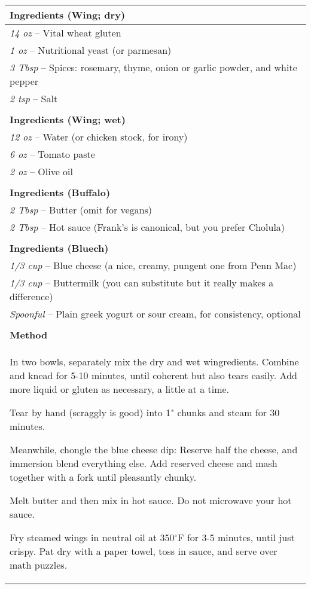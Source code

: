 \documentclass[12pt]{article}
\begin{document}
\vspace{1em}

\noindent \begin{tabular}{p{}}
	{\bf Ingredients (Wing; dry)} \\
	\hline
	{\em 14 oz} -- Vital wheat gluten \\
	{\em 1 oz} -- Nutritional yeast (or parmesan) \\
	{\em 3 Tbsp} -- Spices: rosemary, thyme, onion or garlic powder, and white pepper \\
	{\em 2 tsp} -- Salt \\
	\\
	{\bf Ingredients (Wing; wet)} \\
	\hline
	{\em 12 oz} -- Water (or chicken stock, for irony) \\
	{\em 6 oz} -- Tomato paste \\
	{\em 2 oz} -- Olive oil \\
	\\
	{\bf Ingredients (Buffalo)} \\
	\hline
	{\em 2 Tbsp} -- Butter (omit for vegans) \\
	{\em 2 Tbsp} -- Hot sauce (Frank's is canonical, but you prefer Cholula) \\
	\\
	{\bf Ingredients (Bluech)} \\
	\hline
	{\em 1/3 cup} -- Blue cheese (a nice, creamy, pungent one from Penn Mac) \\
	{\em 1/3 cup} -- Buttermilk (you can substitute but it really makes a difference) \\
	{\em Spoonful} -- Plain greek yogurt or sour cream, for consistency, optional \\
	\\
	{\bf Method} \\
	\hline
\setlength{\parskip}{0.5em}
	In two bowls, separately mix the dry and wet wingredients. Combine and knead for 5-10 minutes, until coherent but also tears easily. Add more liquid or gluten as necessary, a little at a time.

	Tear by hand (scraggly is good) into 1" chunks and steam for 30 minutes.

	Meanwhile, chongle the blue cheese dip: Reserve half the cheese, and immersion blend everything else. Add reserved cheese and mash together with a fork until pleasantly chunky.

	Melt butter and then mix in hot sauce. Do not microwave your hot sauce.

	Fry steamed wings in neutral oil at 350$^{\circ}$F for 3-5 minutes, until just crispy. Pat dry with a paper towel, toss in sauce, and serve over math puzzles.
\end{tabular}
\end{document}
